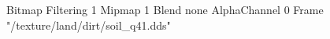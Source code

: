{Bitmap
	{Filtering 1}
	{Mipmap 1}
	{Blend none}
	{AlphaChannel 0}
	{Frame "/texture/land/dirt/soil_q41.dds"}
}
